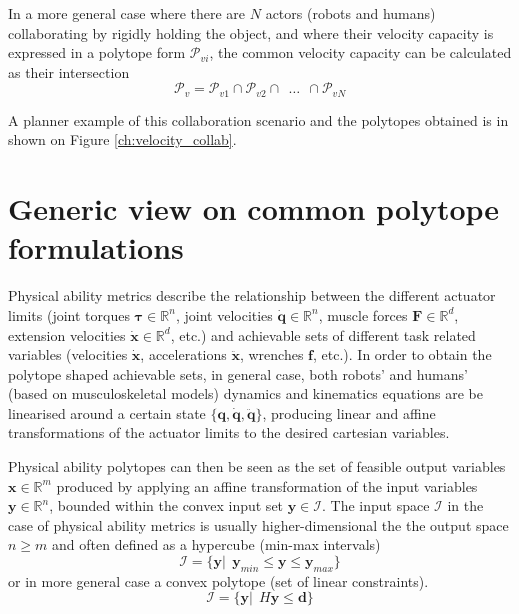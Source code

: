 In a more general case where there are $N$ actors (robots and humans) collaborating by rigidly holding the object, and where their velocity capacity is expressed in a polytope form $\mathcal{P}_{vi}$, the common velocity capacity can be calculated as their intersection
\begin{equation}
    \mathcal{P}_v =  \mathcal{P}_{v1} \cap \mathcal{P}_{v2} \cap ~~ \ldots ~~\cap \mathcal{P}_{vN}
\end{equation}

A planner example of this collaboration scenario and the polytopes obtained is in shown on Figure \ref{ch:velocity_collab}. 


\section{Generic view on common polytope formulations}
\label{ch:generic_view}

Physical ability metrics describe the relationship between the different actuator limits (joint torques $\bm{\tau} \in \mathbb{R}^n$, joint velocities $\dot{\bm{q}} \in \mathbb{R}^n$, muscle forces $\bm{F} \in \mathbb{R}^d$, extension velocities $\dot{\bm{x}} \in \mathbb{R}^d$, etc.) and achievable sets of different task related variables (velocities $\dot{\bm{x}}$, accelerations $\ddot{\bm{x}}$, wrenches $\bm{f}$, etc.). In order to obtain the polytope shaped achievable sets, in general case, both robots' and humans' (based on musculoskeletal models) dynamics and kinematics equations are be linearised around a certain state $\{\bm{q},\dot{\bm{q}},\ddot{\bm{q}} \}$, producing linear and affine transformations of the actuator limits to the desired cartesian variables. 

Physical ability polytopes can then be seen as the set of feasible output variables $\bm{x} \in \mathbb{R}^m$ produced by applying an affine transformation of the input variables $\bm{y} \in \mathbb{R}^n$, bounded within the convex input set $\bm{y}\in\mathcal{I}$. The input space $\mathcal{I}$ in the case of physical ability metrics is usually higher-dimensional the the output space $n\geq m$ and often defined as a hypercube (min-max intervals) 
\begin{equation}
    \mathcal{I} = \{\bm{y} |~~ \bm{y}_{min} \leq \bm{y}\leq \bm{y}_{max} \}
    \label{eq:hypercube_lim}
\end{equation}
or in more general case a convex polytope (set of linear constraints).
\begin{equation}
    \mathcal{I} = \{\bm{y} |~~ H\bm{y}\leq \bm{d} \}
\end{equation}


